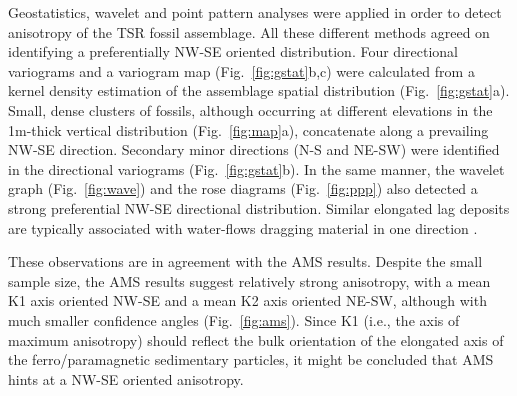 \documentclass[review,times,authoryear]{elsarticle} %
\begin{document}
Geostatistics, wavelet and point pattern analyses were applied in order to detect anisotropy of the TSR fossil assemblage. All these different methods agreed on identifying a preferentially NW-SE oriented distribution. Four directional variograms and a variogram map (Fig.~\ref{fig:gstat}b,c) were calculated from a kernel density estimation of the assemblage spatial distribution (Fig.~\ref{fig:gstat}a). Small, dense clusters of fossils, although occurring at different elevations in the 1m-thick vertical distribution (Fig.~\ref{fig:map}a), concatenate along a prevailing NW-SE direction. Secondary minor directions (N-S and NE-SW) were identified in the directional variograms (Fig.~\ref{fig:gstat}b). In the same manner, the wavelet graph (Fig.~\ref{fig:wave}) and the rose diagrams (Fig.~\ref{fig:ppp}) also detected a strong preferential NW-SE directional distribution. Similar elongated lag deposits are typically associated with water-flows dragging material in one direction \citep{Dominguez-Rodrigo2012}.

These observations are in agreement with the AMS results. Despite the small sample size, the AMS results suggest relatively strong anisotropy, with a mean K1 axis oriented NW-SE and a mean K2 axis oriented NE-SW, although with much smaller confidence angles (Fig.~\ref{fig:ams}). Since K1 (i.e., the axis of maximum anisotropy) should reflect the bulk orientation of the elongated axis of the ferro/paramagnetic sedimentary particles, it might be concluded that AMS hints at a NW-SE oriented anisotropy.


\end{document}
